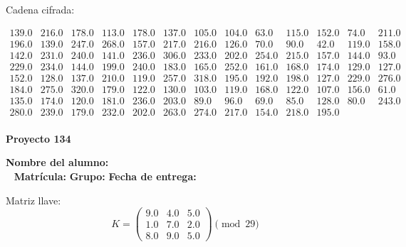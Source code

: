 \documentclass[12pt]{article}
\begin{document}
Cadena cifrada:
\begin{center}
$\begin{array}{lllllllllllll}
139.0 & 216.0 & 178.0 & 113.0 & 178.0 & 137.0 & 105.0 & 104.0 & 63.0 & 115.0 & 152.0 & 74.0 & 211.0\\
196.0 & 139.0 & 247.0 & 268.0 & 157.0 & 217.0 & 216.0 & 126.0 & 70.0 & 90.0 & 42.0 & 119.0 & 158.0\\
142.0 & 231.0 & 240.0 & 141.0 & 236.0 & 306.0 & 233.0 & 202.0 & 254.0 & 215.0 & 157.0 & 144.0 & 93.0\\
229.0 & 234.0 & 144.0 & 199.0 & 240.0 & 183.0 & 165.0 & 252.0 & 161.0 & 168.0 & 174.0 & 129.0 & 127.0\\
152.0 & 128.0 & 137.0 & 210.0 & 119.0 & 257.0 & 318.0 & 195.0 & 192.0 & 198.0 & 127.0 & 229.0 & 276.0\\
184.0 & 275.0 & 320.0 & 179.0 & 122.0 & 130.0 & 103.0 & 119.0 & 168.0 & 122.0 & 107.0 & 156.0 & 61.0\\
135.0 & 174.0 & 120.0 & 181.0 & 236.0 & 203.0 & 89.0 & 96.0 & 69.0 & 85.0 & 128.0 & 80.0 & 243.0\\
280.0 & 239.0 & 179.0 & 232.0 & 202.0 & 263.0 & 274.0 & 217.0 & 154.0 & 218.0 & 195.0\\
\end{array}$
\end{center}

\newpage


\textbf{Proyecto 134}

\textbf{Nombre del alumno:} \underline{\hspace{13cm}}\\\
\vspace{1cm}
\textbf{Matrícula:} \underline{\hspace{4cm}} \hspace{1cm}
\textbf{Grupo:} \underline{\hspace{2cm}}
\textbf{Fecha de entrega:} \underline{\hspace{2cm}}

\medskip

Matriz llave:
\[
K = \begin{pmatrix}
9.0 & 4.0 & 5.0\\
1.0 & 7.0 & 2.0\\
8.0 & 9.0 & 5.0
\end{pmatrix} \pmod{29}
\]
\end{document}
